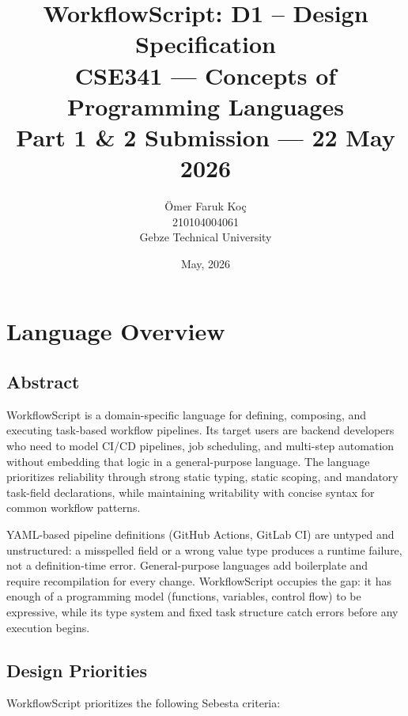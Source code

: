 \documentclass[10pt,a4paper]{article}
\title{\textbf{WorkflowScript: D1 -- Design Specification}\\[0.5em]
       \large CSE341 --- Concepts of Programming Languages\\[0.3em]
       \normalsize Part 1 \& 2 Submission --- 22 May 2026}
\author{Ömer Faruk Koç \\ \small 210104004061 \\ \small Gebze Technical University}
\date{May, 2026}
\begin{document}
\maketitle
\newpage

\tableofcontents
\newpage

\section{Language Overview}

\subsection{Abstract}

WorkflowScript is a domain-specific language for defining, composing,
and executing task-based workflow pipelines. Its target users are backend
developers who need to model CI/CD pipelines, job scheduling, and
multi-step automation without embedding that logic in a general-purpose
language.
The language prioritizes reliability through strong static typing, static scoping, and mandatory task-field declarations, while maintaining writability with concise syntax for common workflow patterns.

YAML-based pipeline definitions (GitHub Actions, GitLab CI) are untyped
and unstructured: a misspelled field or a wrong value type produces a
runtime failure, not a definition-time error. General-purpose languages
add boilerplate and require recompilation for every change.
WorkflowScript occupies the gap: it has enough of a programming model
(functions, variables, control flow) to be expressive, while its type
system and fixed task structure catch errors before any execution begins.

\subsection{Design Priorities}

WorkflowScript prioritizes the following Sebesta criteria:
\end{document}
